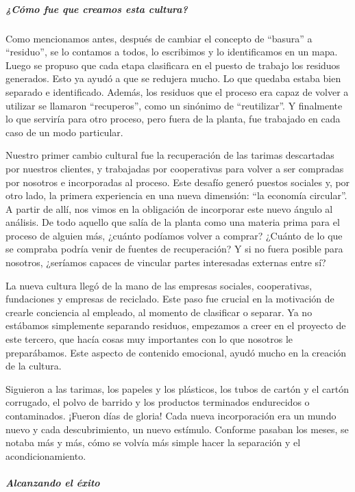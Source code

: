 \documentclass[
]{article}
\begin{document}
\hypertarget{cuxf3mo-fue-que-creamos-esta-cultura}{%
\subparagraph{¿Cómo fue que creamos esta
cultura?}\label{cuxf3mo-fue-que-creamos-esta-cultura}}

Como mencionamos antes, después de cambiar el concepto de ``basura'' a
``residuo'', se lo contamos a todos, lo escribimos y lo identificamos en
un mapa. Luego se propuso que cada etapa clasificara en el puesto de
trabajo los residuos generados. Esto ya ayudó a que se redujera mucho.
Lo que quedaba estaba bien separado e identificado. Además, los residuos
que el proceso era capaz de volver a utilizar se llamaron ``recuperos'',
como un sinónimo de ``reutilizar''. Y finalmente lo que serviría para
otro proceso, pero fuera de la planta, fue trabajado en cada caso de un
modo particular.

Nuestro primer cambio cultural fue la recuperación de las tarimas
descartadas por nuestros clientes, y trabajadas por cooperativas para
volver a ser compradas por nosotros e incorporadas al proceso. Este
desafío generó puestos sociales y, por otro lado, la primera experiencia
en una nueva dimensión: ``la economía circular''. A partir de allí, nos
vimos en la obligación de incorporar este nuevo ángulo al análisis. De
todo aquello que salía de la planta como una materia prima para el
proceso de alguien más, ¿cuánto podíamos volver a comprar? ¿Cuánto de lo
que se compraba podría venir de fuentes de recuperación? Y si no fuera
posible para nosotros, ¿seríamos capaces de vincular partes interesadas
externas entre sí?

La nueva cultura llegó de la mano de las empresas sociales,
cooperativas, fundaciones y empresas de reciclado. Este paso fue crucial
en la motivación de crearle conciencia al empleado, al momento de
clasificar o separar. Ya no estábamos simplemente separando residuos,
empezamos a creer en el proyecto de este tercero, que hacía cosas muy
importantes con lo que nosotros le preparábamos. Este aspecto de
contenido emocional, ayudó mucho en la creación de la cultura.

Siguieron a las tarimas, los papeles y los plásticos, los tubos de
cartón y el cartón corrugado, el polvo de barrido y los productos
terminados endurecidos o contaminados. ¡Fueron días de gloria! Cada
nueva incorporación era un mundo nuevo y cada descubrimiento, un nuevo
estímulo. Conforme pasaban los meses, se notaba más y más, cómo se
volvía más simple hacer la separación y el acondicionamiento.

\hypertarget{alcanzando-el-uxe9xito}{%
\subparagraph{Alcanzando el éxito}\label{alcanzando-el-uxe9xito}}
\end{document}
